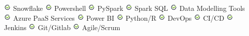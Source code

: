 \documentclass[]{deedy-resume-openfont}
\begin{document}
\begin{minipage}[t]{0.37\textwidth}
{\includegraphics{images/bullet1.png} Snowflake
\includegraphics{images/bullet1.png} Powershell
\includegraphics{images/bullet1.png} PySpark
\includegraphics{images/bullet1.png} Spark SQL
\includegraphics{images/bullet1.png} Data Modelling Tools
\includegraphics{images/bullet1.png} Azure PaaS Services
\includegraphics{images/bullet1.png} Power BI
\includegraphics{images/bullet1.png} Python/R
\includegraphics{images/bullet1.png} DevOps
\includegraphics{images/bullet1.png} CI/CD
\includegraphics{images/bullet1.png} Jenkins
\includegraphics{images/bullet1.png} Git/Gitlab
\includegraphics{images/bullet1.png} Agile/Scrum
}

\sectionsep

\end{minipage}
\end{document}
